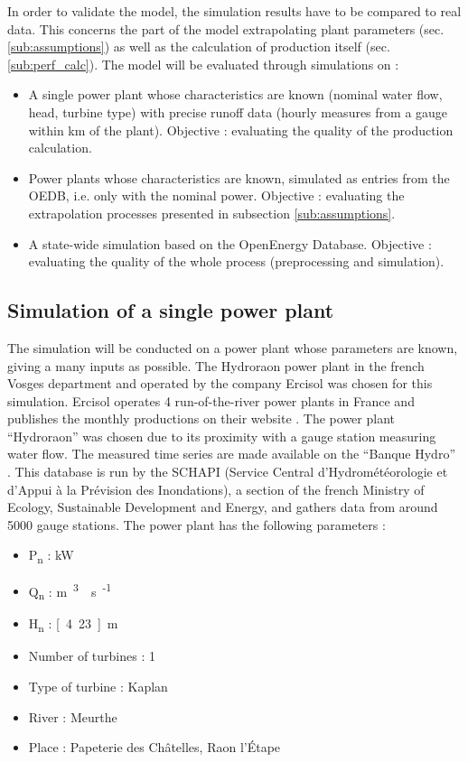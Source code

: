 In order to validate the model, the simulation results have to be compared to real data. This concerns the part of the model extrapolating plant parameters (sec. \ref{sub:assumptions}) as well as the calculation of production itself (sec. \ref{sub:perf_calc}). \newline
The model will be evaluated through simulations on :
\begin{itemize}
 \item A single power plant whose characteristics are known (nominal water flow, head, turbine type) with precise runoff data (hourly measures from a gauge within \unit[2]{km} of the plant). Objective : evaluating the quality of the production calculation.
 \item Power plants whose characteristics are known, simulated as entries from the OEDB, i.e. only with the nominal power. Objective : evaluating the extrapolation processes presented in subsection \ref{sub:assumptions}.
 \item A state-wide simulation based on the OpenEnergy Database. Objective : evaluating the quality of the whole process (preprocessing and simulation).
\end{itemize}

\subsection{Simulation of a single power plant}

The simulation will be conducted on a power plant whose parameters are known, giving a many inputs as possible. The Hydroraon power plant in the french Vosges department and operated by the company Ercisol was chosen for this simulation. Ercisol operates 4 run-of-the-river power plants in France and publishes the monthly productions on their website \cite{ercisol}. The power plant ``Hydroraon'' was chosen due to its proximity with a gauge station measuring water flow. The measured time series are made available on the ``Banque Hydro'' \cite{eaufrance}. This database is run by the SCHAPI (Service Central d'Hydrométéorologie et d'Appui à la Prévision des Inondations), a section of the french Ministry of Ecology, Sustainable Development and Energy, and gathers data from around 5000 gauge stations. \newline
The power plant has the following parameters :
\begin{itemize}
 \item P\textsubscript{n} \tabto{4cm}: \unit[400]{kW}
 \item Q\textsubscript{n} \tabto{4cm}: \unit[12]{m\textsuperscript{3}\textperiodcentered s\textsuperscript{-1}}
 \item H\textsubscript{n} \tabto{4cm}: \unit[4.23]{m}
 \item Number of turbines \tabto{4cm}: 1
 \item Type of turbine \tabto{4cm}: Kaplan
 \item River \tabto{4cm}: Meurthe
 \item Place \tabto{4cm}: Papeterie des Châtelles, Raon l'Étape
\end{itemize}

